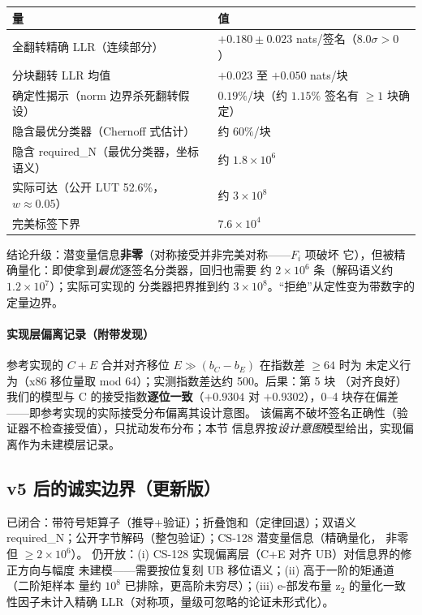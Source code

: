 \documentclass[11pt,a4paper]{ctexart}
\begin{document}
\begin{table}[htbp]\centering\small
\begin{tabular}{@{}ll@{}}
\toprule
量 & 值 \\
\midrule
全翻转精确 LLR（连续部分） & $+0.180\pm0.023$ nats/签名（$8.0\sigma>0$） \\
分块翻转 LLR 均值 & $+0.023$ 至 $+0.050$ nats/块 \\
确定性揭示（norm 边界杀死翻转假设） & $0.19\%$/块（约 $1.15\%$ 签名有 $\ge1$ 块确定） \\
隐含最优分类器（Chernoff 式估计） & 约 $60\%$/块 \\
隐含 required\_N（最优分类器，坐标语义） & 约 $1.8\times10^6$ \\
实际可达（公开 LUT 52.6\%，$w\approx0.05$） & 约 $3\times10^8$ \\
完美标签下界 & $7.6\times10^4$ \\
\bottomrule
\end{tabular}
\end{table}

结论升级：潜变量信息\textbf{非零}（对称接受并非完美对称——$F_i$ 项破坏
它），但被精确量化：即使拿到\emph{最优}逐签名分类器，回归也需要
约 $2\times10^6$ 条（解码语义约 $1.2\times10^7$）；实际可实现的
分类器把界推到约 $3\times10^8$。``拒绝''从定性变为带数字的定量边界。

\paragraph{实现层偏离记录（附带发现）}
参考实现的 $C{+}E$ 合并对齐移位 $E\gg(b_C-b_E)$ 在指数差 $\ge64$ 时为
未定义行为（x86 移位量取 mod 64）；实测指数差达约 500。后果：第 5 块
（对齐良好）我们的模型与 C 的接受指数\textbf{逐位一致}（$+0.9304$ 对
$+0.9302$），0--4 块存在偏差——即参考实现的实际接受分布偏离其设计意图。
该偏离不破坏签名正确性（验证器不检查接受值），只扰动发布分布；本节
信息界按\emph{设计意图}模型给出，实现偏离作为未建模层记录。

\subsection{v5 后的诚实边界（更新版）}

已闭合：带符号矩算子（推导+验证）；折叠饱和（定律回退）；双语义
required\_N；公开字节解码（整包验证）；CS-128 潜变量信息（精确量化，
非零但 $\ge 2\times10^6$）。
仍开放：(i) CS-128 实现偏离层（C+E 对齐 UB）对信息界的修正方向与幅度
未建模——需要按位复刻 UB 移位语义；(ii) 高于一阶的矩通道（二阶矩样本
量约 $10^8$ 已排除，更高阶未穷尽）；(iii) e-部发布量 z$_2$ 的量化一致
性因子未计入精确 LLR（对称项，量级可忽略的论证未形式化）。
\end{document}
